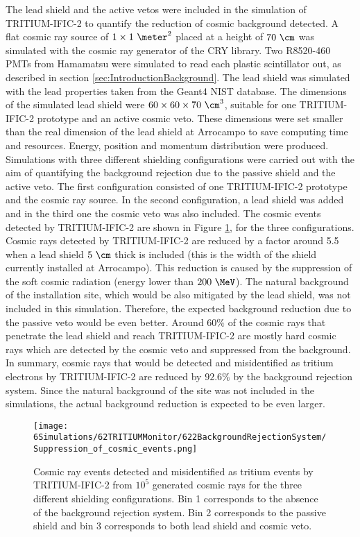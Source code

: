The lead shield and the active vetos were included in the simulation of TRITIUM-IFIC-2 to quantify the reduction of cosmic background detected. A flat cosmic ray source of $1 \times 1~\meter^2$ placed at a height of $70~\cm$ was simulated with the cosmic ray generator of the CRY library. Two R8520-460 PMTs from Hamamatsu were simulated to read each plastic scintillator out, as described in section \ref{sec:IntroductionBackground}. The lead shield was simulated with the lead properties taken from the Geant4 NIST database. The dimensions of the simulated lead shield were $60 \times 60 \times 70~\cm^3$, suitable for one TRITIUM-IFIC-2 prototype and an active cosmic veto. These dimensions were set smaller than the real dimension of the lead shield at Arrocampo to save computing time and resources. Energy, position and momentum distribution were produced. Simulations with three different shielding configurations were carried out with the aim of quantifying the background rejection due to the passive shield and the active veto. The first configuration consisted of one TRITIUM-IFIC-2 prototype and the cosmic ray source. In the second configuration, a lead shield was added and in the third one the cosmic veto was also included. The cosmic events detected by TRITIUM-IFIC-2 are shown in Figure \ref{fig:CosmicEventsSuppressionSimulated}, for the three configurations. Cosmic rays detected by TRITIUM-IFIC-2 are reduced by a factor around 5.5 when a lead shield $5~\cm$ thick is included (this is the width of the shield currently installed at Arrocampo). This reduction is caused by the suppression of the soft cosmic radiation (energy lower than $200~\MeV$). The natural background of the installation site, which would be also mitigated by the lead shield, was not included in this simulation. Therefore, the expected background reduction due to the passive veto would be even better. Around $60\%$ of the cosmic rays that penetrate the lead shield and reach TRITIUM-IFIC-2 are mostly hard cosmic rays which are detected by the cosmic veto and suppressed from the background. In summary, cosmic rays that would be detected and misidentified as tritium electrons by TRITIUM-IFIC-2 are reduced by $92.6\%$ by the background rejection system. Since the natural background of the site was not included in the simulations, the actual background reduction is expected to be even larger.

\begin{figure}[h]
\texttt{[image: 6Simulations/62TRITIUMMonitor/622BackgroundRejectionSystem/Suppression\_of\_cosmic\_events.png]}
\centering
\caption{Cosmic ray events detected and misidentified as tritium events by TRITIUM-IFIC-2 from $10^5$ generated cosmic rays for the three different shielding configurations. Bin 1 corresponds to the absence of the background rejection system. Bin 2 corresponds to the passive shield and bin 3 corresponds to both lead shield and cosmic veto.  \label{fig:CosmicEventsSuppressionSimulated}}
\end{figure}